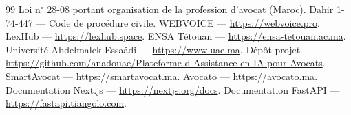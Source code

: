 \begin{thebibliography}{99}
 Loi n$^{\circ}$ 28-08 portant organisation de la profession d'avocat (Maroc).
 Dahir 1-74-447 --- Code de procédure civile.
 WEBVOICE --- \url{https://webvoice.pro}.
 LexHub --- \url{https://lexhub.space}.
 ENSA Tétouan --- \url{https://ensa-tetouan.ac.ma}.
 Université Abdelmalek Essaâdi --- \url{https://www.uae.ma}.
 Dépôt projet --- \url{https://github.com/anadouae/Plateforme-d-Assistance-en-IA-pour-Avocats}.
 SmartAvocat --- \url{https://smartavocat.ma}.
 Avocato --- \url{https://avocato.ma}.
 Documentation Next.js --- \url{https://nextjs.org/docs}.
 Documentation FastAPI --- \url{https://fastapi.tiangolo.com}.
\end{thebibliography}
